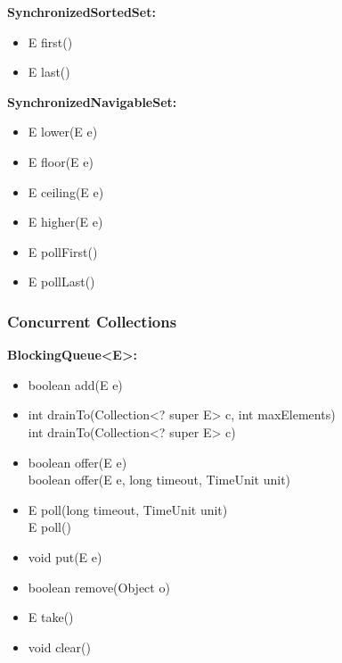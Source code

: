 \documentclass[]{usiinfthesis}
\begin{document}
{\noindent
\textbf{SynchronizedSortedSet:}
\begin{itemize}
    \item  E first()
    \item  E last()
\end{itemize}

\noindent
\textbf{SynchronizedNavigableSet:}
\begin{itemize}
\item  E lower(E e)
\item  E floor(E e)
\item  E ceiling(E e)
\item  E higher(E e)
\item  E pollFirst()
\item  E pollLast()
\end{itemize}





\subsubsection{Concurrent Collections}




\noindent
\textbf{BlockingQueue<E>:}
\begin{itemize}
    \item boolean add(E e)
    \item int drainTo(Collection<? super E> c, int maxElements)
    \mbox{}\\ int drainTo(Collection<? super E> c)
    \item boolean offer(E e)
    \mbox{}\\ boolean offer(E e, long timeout, TimeUnit unit)
    \item E poll(long timeout, TimeUnit unit)
    \mbox{}\\ E poll()
    \item void put(E e)
    \item boolean remove(Object o)
    \item E take()
    \item void clear() 
\end{itemize}

}
\end{document}
